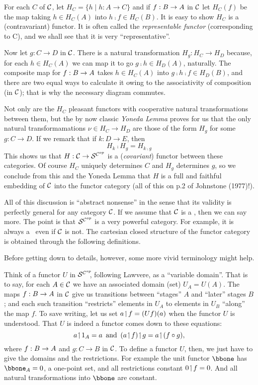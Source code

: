 For each $C$ of $\mathcal C$, let $H_C = \{ h \mid h: A \to C \}$ and if $f: B \rightarrow A$ in $\mathcal C$ let $H_C(f)$ be the map taking $h \in H_C(A)$ into $h \comp f \in H_C(B)$.
It is easy to show $H_C$ is a (contravariant) functor. It is often called the {\it representable functor} (corresponding to C), and we shall see that it is very ``representative''.

Now let $g: C \to D$ in $\mathcal C$. There is a natural transformation
$H_g: H_C \to H_D$ because, for each $h \in H_C(A)$ we can map it to go $g \comp h \in H_D(A)$, naturally. The composite map for $f : B \rightarrow A$
takes $h \in H_C(A)$ into $g \comp h \comp f \in H_D(B)$, and there are two equal
ways to calculate it owing to the associativity of composition (in $\mathcal C$); that is why the necessary diagram commutes.

Not only are the $H_C$ pleasant functors with cooperative natural transformations between them, but the by now classic {\it Yoneda Lemma}
proves for us that the only natural transformamations $\nu \in H_C \to H_D$
are those of the form $H_g$ for some $g: C\to D$. If we remark that if $k:D\to E$, then
$$
H_k \comp H_g = H_{k \comp g}
$$
%
This shows us that $H : \mathcal C \rightarrow \mathcal S^{\mathcal C^{op}}$ is a ({\it covariant}) functor between these categories.
Of course $H_C$ uniquely determines $C$ and
$H_g$ determines $g$, so we conclude from this and the Yoneda Lemma that $H$ is a full and faithful embedding of $\mathcal C$ into the functor
category (all of this on p.2 of Johnstone (1977)!).

All of this discussion is ``abstract nonsense'' in the sense that its validity is perfectly general for any category $\mathcal C$. If we assume that $\mathcal C$ is a \ccc, then we can say more. The point is that $\mathcal S^{\mathcal C^{op}}$ is a very powerful category. For example, it is
always a \ccc\  even if $\mathcal C$ is not. The cartesian closed structure of the functor category is obtained through the following definitions.

Before getting down to details, however, some more vivid terminology might help.

Think of a functor $U$ in $\mathcal S^{\mathcal C^{op}}\!\!$, following Lawvere, as a ``variable domain''.  That is to say, for each $A \in \mathcal C$ we have an associated domain (set) $U_A = U(A)$. The maps $f:B \rightarrow A$ in $\mathcal C$ give us transitions between ``stages'' $A$ and ``later'' stages $B$; and each such transition ``restricts'' elements in
$U_A$ to elements in $U_B$ ``along'' the map $f$. To save writing, let us set $a \!\upharpoonleft\! f = (Uf)(a)$ when the functor $U$ is understood. That $U$ is indeed a functor comes down to these equations:
$$
a \res \id_A = a \,\textrm{ and }\, (a \res f) \res g = a \res (f \comp g),
$$
where  $f : B \rightarrow A$ and $g: C\to B$ in $\mathcal C$. To define a functor $U$, then, we just have to give the domains and the restrictions.
For example the unit functor $\bbone$ has $\bbone_A = {0}$, a one-point set, and all restrictions constant $0 \!\upharpoonleft\! f = 0$. And all natural transformations into $\bbone$ are constant.

